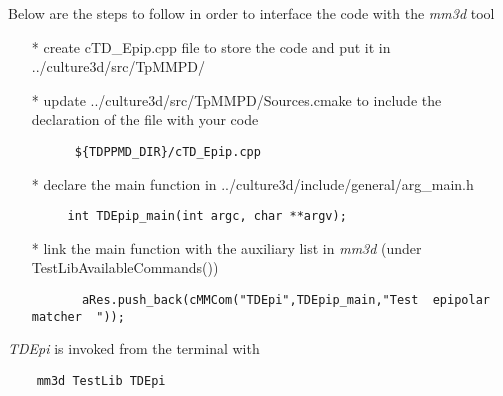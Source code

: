 


\noindent Below are the steps to follow in order to interface the code with the \emph{mm3d} tool
\begin{itemize}
  \item[*] create cTD\_Epip.cpp file to store the code and put it in ../culture3d/src/TpMMPD/

  \item[*] update ../culture3d/src/TpMMPD/Sources.cmake to include the declaration of the file with your code
    \begin{lstlisting}
	  ${TDPPMD_DIR}/cTD_Epip.cpp
       \end{lstlisting}
  \item[*] declare the main function in ../culture3d/include/general/arg\_main.h
       \begin{lstlisting}
	 int TDEpip_main(int argc, char **argv);
       \end{lstlisting}
     \item[*] link the main function with the auxiliary list in \emph{mm3d} (under TestLibAvailableCommands())
	\begin{lstlisting}
	   aRes.push_back(cMMCom("TDEpi",TDEpip_main,"Test  epipolar matcher  "));
	\end{lstlisting}
\end{itemize}

\noindent \emph{TDEpi} is invoked from the terminal with
\begin{lstlisting}
	mm3d TestLib TDEpi
\end{lstlisting}



